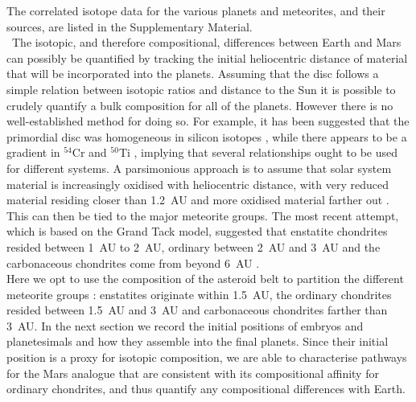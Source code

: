 \documentclass[preprint,5p,times,authoryear]{elsarticle}
\begin{document}
The correlated isotope data for the various planets and meteorites, and their sources, are listed in the Supplementary Material.\\

{\ The isotopic, and therefore compositional, differences between Earth and Mars can possibly be quantified by tracking the initial 
heliocentric distance of material that will be incorporated into the planets. Assuming that the disc follows a simple relation between 
isotopic ratios and distance to the Sun it is possible to crudely quantify a bulk composition for all of the planets. However there is 
no well-established method for doing so. For example, it has been suggested that the primordial disc was homogeneous in silicon 
isotopes \citep{P13b}, while there appears to be a gradient in $^{54}$Cr and $^{50}$Ti \citep{Y10}, implying that several 
relationships ought to be used for different systems. A parsimonious approach is to assume that solar system material is increasingly 
oxidised with heliocentric distance, with very reduced material residing closer than 1.2~AU and more oxidised material farther out 
\citep{R15}. This can then be tied to the major meteorite groups. The most recent attempt, which is based on the Grand Tack 
model, suggested that enstatite chondrites resided between 1~AU to 2~AU, ordinary between 2~AU and 3~AU and the carbonaceous 
chondrites come from beyond 6~AU \citep{FGK17}.\\

Here we opt to use the composition of the asteroid belt to partition the different meteorite groups \citep{DC14}: enstatites 
originate within 1.5~AU, the ordinary chondrites resided between 1.5~AU and 3~AU and carbonaceous chondrites farther than 3~AU. In the 
next section we record the initial positions of embryos and planetesimals and how they assemble into the final planets. Since their 
initial position is a proxy for isotopic composition, we are able to characterise pathways for the Mars analogue that are consistent 
with its compositional affinity for ordinary chondrites, and thus quantify any compositional differences with Earth.}
\end{document}

